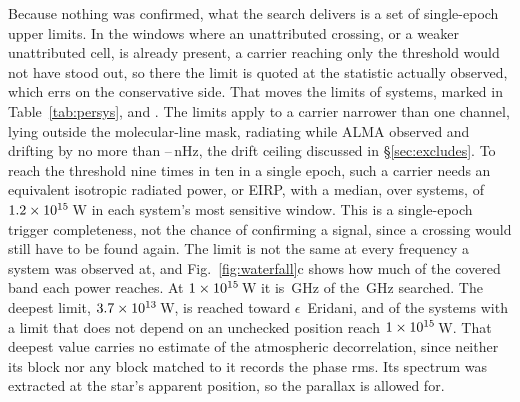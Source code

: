 Because nothing was confirmed, what the search delivers is a set of
single-epoch upper limits. In the \XwNWin{} windows where an unattributed
crossing, or a weaker unattributed cell, is already present, a carrier
reaching only the threshold would not have stood out, so there the limit is
quoted at the statistic actually observed, which errs on the conservative
side. That moves the limits of \XwNSysWord{} systems, marked in
Table~\ref{tab:persys}, and \XwHeadlineClause. The limits apply to a
carrier narrower than one channel, lying outside the molecular-line mask,
radiating while ALMA observed and drifting by no more than
\DriftCeilLo--\DriftCeilHi\,nHz, the drift ceiling discussed in
\S\ref{sec:excludes}. To reach the threshold nine times in ten in a single
epoch, such a carrier needs an equivalent isotropic radiated power, or EIRP,
with a median, over systems, of $1.2\times10^{15}$\,W in each system's
most sensitive window. This is a single-epoch trigger completeness, not the
chance of confirming a signal, since a crossing would still have to be found
again. The limit is not the same at every frequency a system was observed
at, and Fig.~\ref{fig:waterfall}c shows how much of the covered band each
power reaches. At $1\times10^{15}$\,W it is \CovUnionAtRef\,GHz of the
\CvUnionA\,GHz searched. The deepest limit, $3.7\times10^{13}$\,W, is reached toward
$\epsilon$~Eridani, and \NSysEfifteen{} of the \NSysALimSum{} systems with a
limit that does not depend on an unchecked position reach
$1\times10^{15}$\,W. That deepest value carries no estimate of the
atmospheric decorrelation, since neither its block nor any block matched to
it records the phase rms. Its spectrum was extracted at the star's apparent
position, so the parallax is allowed for.


